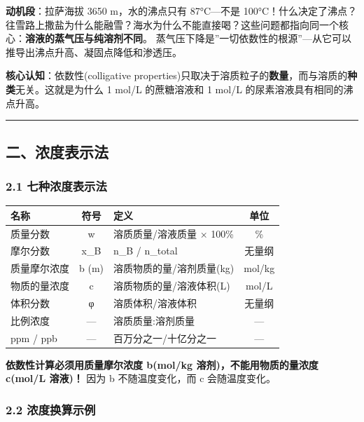 \documentclass[a4paper,11pt]{ctexart}
\newcounter{none}
\begin{document}
\textbf{动机段}：拉萨海拔 3650 m，水的沸点只有 87°C---不是 100°C！什么决定了沸点？往雪路上撒盐为什么能融雪？海水为什么不能直接喝？这些问题都指向同一个核心：\textbf{溶液的蒸气压与纯溶剂不同}。
蒸气压下降是''一切依数性的根源''---从它可以推导出沸点升高、凝固点降低和渗透压。

\textbf{核心认知}：依数性(colligative properties)只取决于溶质粒子的\textbf{数量}，而与溶质的\textbf{种类}无关。这就是为什么 1 mol/L 的蔗糖溶液和 1 mol/L 的尿素溶液具有相同的沸点升高。

\begin{center}\rule{0.5\linewidth}{0.5pt}\end{center}

\subsection{二、浓度表示法}\label{ux4e8cux6d53ux5ea6ux8868ux793aux6cd5}

\subsubsection{2.1 七种浓度表示法}\label{ux4e03ux79cdux6d53ux5ea6ux8868ux793aux6cd5}

{\def\LTcaptype{none} %
\begin{longtable}[]{@{}lclc@{}}
\toprule\noalign{}
名称 & 符号 & 定义 & 单位 \\
\midrule\noalign{}
\endhead
\bottomrule\noalign{}
\endlastfoot
质量分数 & w & 溶质质量/溶液质量 × 100\% & \% \\
摩尔分数 & x\_B & n\_B / n\_total & 无量纲 \\
质量摩尔浓度 & b (m) & 溶质物质的量/溶剂质量(kg) & mol/kg \\
物质的量浓度 & c & 溶质物质的量/溶液体积(L) & mol/L \\
体积分数 & φ & 溶质体积/溶液体积 & 无量纲 \\
比例浓度 & --- & 溶质质量:溶剂质量 & --- \\
ppm / ppb & --- & 百万分之一/十亿分之一 & --- \\
\end{longtable}
}

\textbf{依数性计算必须用质量摩尔浓度 b(mol/kg 溶剂)，不能用物质的量浓度 c(mol/L 溶液)！} 因为 b 不随温度变化，而 c 会随温度变化。

\subsubsection{2.2 浓度换算示例}\label{ux6d53ux5ea6ux6362ux7b97ux793aux4f8b}
\end{document}
